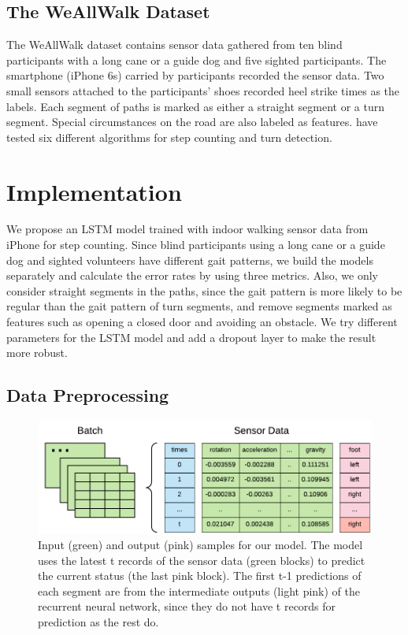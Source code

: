 \documentclass[11pt]{article}
\begin{document}
\subsection{The WeAllWalk Dataset}

The WeAllWalk dataset \cite{flores2016weallwalk} contains sensor data gathered from ten blind participants with a long cane or a guide dog and five sighted participants. The smartphone (iPhone 6s) carried by participants recorded the sensor data. Two small sensors attached to the participants’ shoes recorded heel strike times as the labels. Each segment of paths is marked as either a straight segment or a turn segment. Special circumstances on the road are also labeled as features. \cite{flores2016weallwalk} have tested six different algorithms for step counting and turn detection. 


\section{Implementation}
We propose an LSTM model trained with indoor walking sensor data from iPhone for step counting. Since blind participants using a long cane or a guide dog and sighted volunteers have different gait patterns, we build the models separately and calculate the error rates by using three metrics. Also, we only consider straight segments in the paths, since the gait pattern is more likely to be regular than the gait pattern of turn segments, and remove segments marked as features such as opening a closed door and avoiding an obstacle. We try different parameters for the LSTM model and add a dropout layer to make the result more robust.

\subsection{Data Preprocessing}

\begin{figure}[ht]
\centering
\includegraphics[scale=1]{input2}
\caption{Input (green) and output (pink) samples for our model. The model uses the latest t records of the sensor data (green blocks) to predict the current status (the last pink block). The first t-1 predictions of each segment are from the intermediate outputs (light pink) of the recurrent neural network, since they do not have t records for prediction as the rest do.}
\label{fig:batch_sensor_data}
\end{figure}
\end{document}
